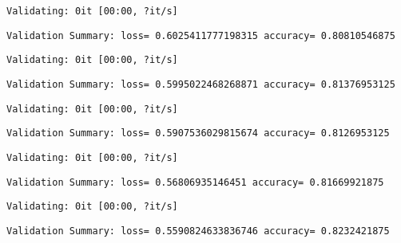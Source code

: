 \documentclass[11pt]{article}
\begin{document}
    
    \begin{Verbatim}[commandchars=\\\{\}]
Validating: 0it [00:00, ?it/s]
    \end{Verbatim}

    
    \begin{Verbatim}[commandchars=\\\{\}]
Validation Summary: loss= 0.6025411777198315 accuracy= 0.80810546875
    \end{Verbatim}

    
    \begin{Verbatim}[commandchars=\\\{\}]
Validating: 0it [00:00, ?it/s]
    \end{Verbatim}

    
    \begin{Verbatim}[commandchars=\\\{\}]
Validation Summary: loss= 0.5995022468268871 accuracy= 0.81376953125
    \end{Verbatim}

    
    \begin{Verbatim}[commandchars=\\\{\}]
Validating: 0it [00:00, ?it/s]
    \end{Verbatim}

    
    \begin{Verbatim}[commandchars=\\\{\}]
Validation Summary: loss= 0.5907536029815674 accuracy= 0.8126953125
    \end{Verbatim}

    
    \begin{Verbatim}[commandchars=\\\{\}]
Validating: 0it [00:00, ?it/s]
    \end{Verbatim}

    
    \begin{Verbatim}[commandchars=\\\{\}]
Validation Summary: loss= 0.56806935146451 accuracy= 0.81669921875
    \end{Verbatim}

    
    \begin{Verbatim}[commandchars=\\\{\}]
Validating: 0it [00:00, ?it/s]
    \end{Verbatim}

    
    \begin{Verbatim}[commandchars=\\\{\}]
Validation Summary: loss= 0.5590824633836746 accuracy= 0.8232421875
    \end{Verbatim}
\end{document}
